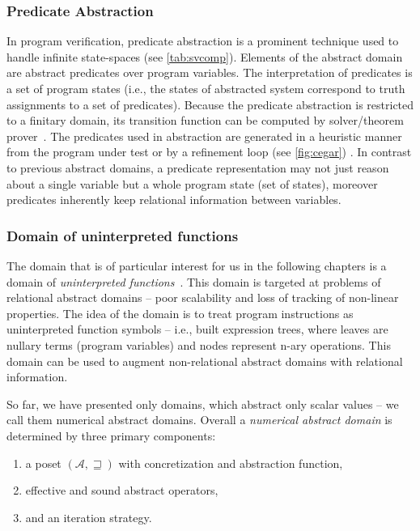 \subsubsection{Predicate Abstraction}

In program verification, predicate abstraction \cite{Graf1997, Bjorner1997} is
a prominent technique used to handle infinite state-spaces (see
\autoref{tab:svcomp}). Elements of the abstract domain are abstract predicates
over program variables. The interpretation of predicates is a set of program
states (i.e., the states of abstracted system correspond to truth assignments
to a set of predicates). Because the predicate abstraction is restricted to a
finitary domain, its transition function can be computed by \smt solver/theorem
prover~\cite{Cousot2003, Ball2001}. The predicates used in abstraction are
generated in a heuristic manner from the program under test or by a refinement
loop (see \autoref{fig:cegar}) \cite{Flanagan2002}. In contrast to previous
abstract domains, a predicate representation may not just reason about a single
variable but a whole program state (set of states), moreover predicates
inherently keep relational information between variables.


\subsubsection{Domain of uninterpreted functions}

The domain that is of particular interest for us in the following chapters is a
domain of \emph{uninterpreted functions}~\cite{Gange2016}. This domain is targeted
at problems of relational abstract domains -- poor scalability and loss of
tracking of non-linear properties. The idea of the domain is to treat program
instructions as uninterpreted function symbols -- i.e., built expression trees,
where leaves are nullary terms (program variables) and nodes represent n-ary
operations. This domain can be used to augment non-relational abstract domains
with relational information.

\bigskip
\prule
\bigskip

\noindent
So far, we have presented only domains, which abstract only scalar values -- we call
them numerical abstract domains.  Overall a \emph{numerical abstract domain} is
determined by three primary components:

\label{sec:ingredients}
\begin{enumerate}
    \item a poset $(\mathcal{A}, \sqsupseteq)$ with concretization and abstraction function,
    \item effective and sound abstract operators,
    \item and an iteration strategy.
\end{enumerate}

